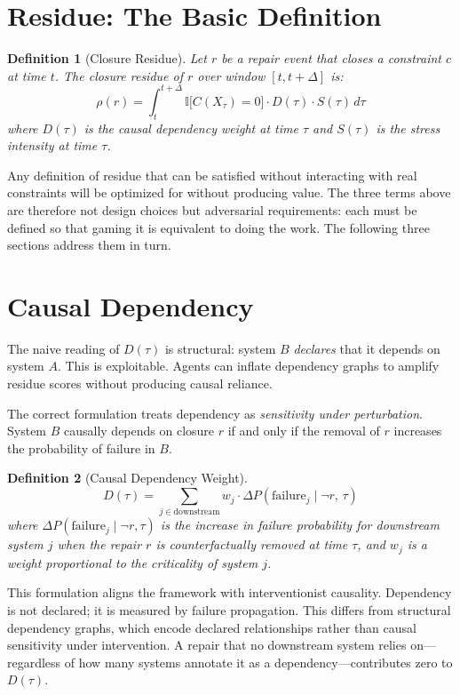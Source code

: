 \documentclass[12pt]{article}
\newtheorem{definition}{Definition}
\begin{document}
\section{Residue: The Basic Definition}

\begin{definition}[Closure Residue]
Let $r$ be a repair event that closes a constraint $c$ at time $t$.
The \emph{closure residue} of $r$ over window $[t, t+\Delta]$ is:
\[
  \rho(r) = \int_{t}^{t+\Delta}
    \mathbb{I}\bigl[C(X_\tau) = 0\bigr]
    \cdot D(\tau)
    \cdot S(\tau)
  \, d\tau
\]
where $D(\tau)$ is the causal dependency weight at time $\tau$ and
$S(\tau)$ is the stress intensity at time $\tau$.
\end{definition}

Any definition of residue that can be satisfied without interacting with
real constraints will be optimized for without producing value. The
three terms above are therefore not design choices but adversarial
requirements: each must be defined so that gaming it is equivalent to
doing the work. The following three sections address them in turn.

\section{Causal Dependency}

The naive reading of $D(\tau)$ is structural: system $B$ \emph{declares}
that it depends on system $A$. This is exploitable. Agents can inflate
dependency graphs to amplify residue scores without producing causal
reliance.

The correct formulation treats dependency as \emph{sensitivity under
perturbation}. System $B$ causally depends on closure $r$ if and only
if the removal of $r$ increases the probability of failure in $B$.

\begin{definition}[Causal Dependency Weight]
\[
  D(\tau) = \sum_{j \in \mathrm{downstream}}
    w_j \cdot \Delta P\!\left(\mathrm{failure}_j \mid \neg r,\, \tau\right)
\]
where $\Delta P(\mathrm{failure}_j \mid \neg r, \tau)$ is the increase
in failure probability for downstream system $j$ when the repair $r$ is
counterfactually removed at time $\tau$, and $w_j$ is a weight
proportional to the criticality of system $j$.
\end{definition}

This formulation aligns the framework with interventionist causality.
Dependency is not declared; it is measured by failure propagation. This
differs from structural dependency graphs, which encode declared
relationships rather than causal sensitivity under intervention. A
repair that no downstream system relies on---regardless of how many
systems annotate it as a dependency---contributes zero to $D(\tau)$.
\end{document}
